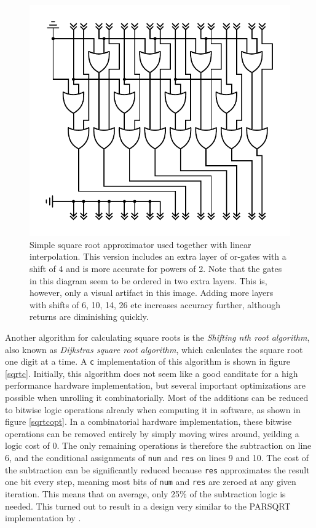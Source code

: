 			\begin{figure}
				\centering
				\caption{ Simple square root approximator used together with
					linear interpolation. This version includes an extra layer
					of or-gates with a shift of 4 and is more accurate for
					powers of 2. Note that the gates in this diagram seem to be
					ordered in two extra layers. This is, however, only a
					visual artifact in this image. Adding more layers with
					shifts of 6, 10, 14, 26 etc increases accuracy further,
					although returns are diminishing quickly.}
				\label{orsqrt3}
				\includegraphics[width=0.75\linewidth]{figure/pdf/sqrt2Or.pdf} 
			\end{figure}

			Another algorithm for calculating square roots is the
			\emph{Shifting nth root algorithm}, also known as \emph{Dijkstras
			square root algorithm}, which calculates the square root one digit
			at a time. A \texttt{c} implementation of this algorithm is shown
			in figure \ref{sqrtc}. Initially, this algorithm does not seem like
			a good canditate for a high performance hardware implementation,
			but several important optimizations are possible when unrolling it
			combinatorially. Most of the additions can be reduced to bitwise
			logic operations already when computing it in software, as shown in
			figure \ref{sqrtcopt}. In a combinatorial hardware implementation,
			these bitwise operations can be removed entirely by simply moving
			wires around, yeilding a logic cost of 0. The only remaining
			operations is therefore the subtraction on line 6, and the
			conditional assignments of \texttt{num} and \texttt{res} on lines 9
			and 10. The cost of the subtraction can be significantly reduced
			because \texttt{res} approximates the result one bit every step,
			meaning most bits of \texttt{num} and \texttt{res} are zeroed at
			any given iteration. This means that on average, only 25\% of the
			subtraction logic is needed. This turned out to result in a design
			very similar to the PARSQRT implementation by \cite{Li}.

